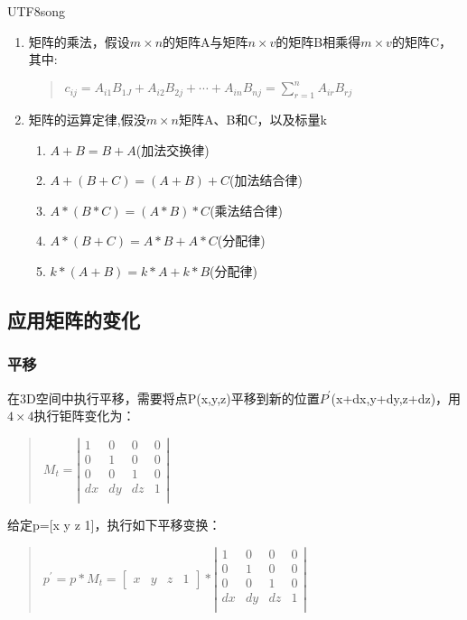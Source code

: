 \documentclass[a4paper,10pt]{article}
\begin{document}
\begin{CJK}{UTF8}{song}
\begin{enumerate}
\begin{quote}
\begin{math}
\begin{array}{cccc}
\end{array}
   \right|
\end{math}
\end{quote}
\item 矩阵的乘法，假设$m\times n$的矩阵A与矩阵$n\times v$的矩阵B相乘得$m\times v$的矩阵C，其中:
\begin{quote}
\begin{math}
c_{ij}=A_{i1}B_{1J}+A_{i2}B_{2j}+\cdots{}+A_{in}B_{nj}=\sum_{r=1}^{n}{A_{ir}B_{rj}}
\end{math}
\end{quote}
\item 矩阵的运算定律,假没$m\times n$矩阵A、B和C，以及标量k
\begin{enumerate}
\item $A+B=B+A$(加法交换律)
\item $A+(B+C)=(A+B)+C$(加法结合律)
\item $A*(B*C)=(A*B)*C$(乘法结合律)
\item $A*(B+C)=A*B+A*C$(分配律)
\item $k*(A+B)=k*A+k*B$(分配律)
\end{enumerate}
\end{enumerate}

\subsection{应用矩阵的变化}
\subsubsection{平移}
在3D空间中执行平移，需要将点P(x,y,z)平移到新的位置$P^{'}$(x+dx,y+dy,z+dz)，用$4\times 4$执行钜阵变化为：
\begin{quote}
\begin{math}
M_{t}=\left|
\begin{array}{cccc}
1&0&0&0 \\
0&1&0&0 \\
0&0&1&0 \\
dx&dy&dz&1 \\
\end{array}
\right|
\end{math} 
\end{quote}
给定p=[x y z 1]，执行如下平移变换：
\begin{quote} 
\begin{math}
p^{'}=p*M_{t}=[\begin{array}{cccc}x &y &z &1 \end{array}]* \left|
\begin{array}{cccc}
1&0&0&0 \\
0&1&0&0 \\
0&0&1&0 \\
dx&dy&dz&1 \\
\end{array}
\right|
\end{math} \\


\end{quote}
\end{CJK}
\end{document}
